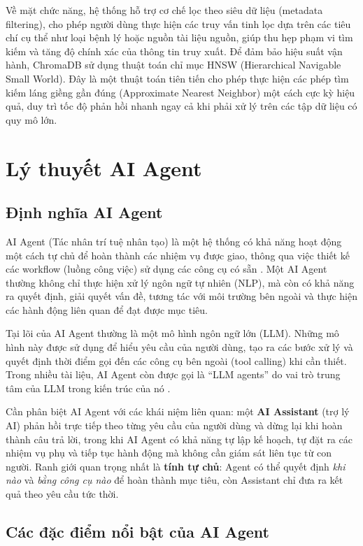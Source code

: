 Về mặt chức năng, hệ thống hỗ trợ cơ chế lọc theo siêu dữ liệu (metadata filtering), cho phép người dùng thực hiện các truy vấn tinh lọc dựa trên các tiêu chí cụ thể như loại bệnh lý hoặc nguồn tài liệu nguồn, giúp thu hẹp phạm vi tìm kiếm và tăng độ chính xác của thông tin truy xuất. Để đảm bảo hiệu suất vận hành, ChromaDB sử dụng thuật toán chỉ mục HNSW (Hierarchical Navigable Small World). Đây là một thuật toán tiên tiến cho phép thực hiện các phép tìm kiếm láng giềng gần đúng (Approximate Nearest Neighbor) một cách cực kỳ hiệu quả, duy trì tốc độ phản hồi nhanh ngay cả khi phải xử lý trên các tập dữ liệu có quy mô lớn.

\section{Lý thuyết AI Agent}

\subsection{Định nghĩa AI Agent}

AI Agent (Tác nhân trí tuệ nhân tạo) là một hệ thống có khả năng hoạt động một cách tự chủ để hoàn thành các nhiệm vụ được giao, thông qua việc thiết kế các workflow (luồng công việc) sử dụng các công cụ có sẵn \cite{ibm2025}. Một AI Agent thường không chỉ thực hiện xử lý ngôn ngữ tự nhiên (NLP), mà còn có khả năng ra quyết định, giải quyết vấn đề, tương tác với môi trường bên ngoài và thực hiện các hành động liên quan để đạt được mục tiêu.

Tại lõi của AI Agent thường là một mô hình ngôn ngữ lớn (LLM). Những mô hình này được sử dụng để hiểu yêu cầu của người dùng, tạo ra các bước xử lý và quyết định thời điểm gọi đến các công cụ bên ngoài (tool calling) khi cần thiết. Trong nhiều tài liệu, AI Agent còn được gọi là ``LLM agents'' do vai trò trung tâm của LLM trong kiến trúc của nó \cite{sumers2023}.

Cần phân biệt AI Agent với các khái niệm liên quan: một \textbf{AI Assistant} (trợ lý AI) phản hồi trực tiếp theo từng yêu cầu của người dùng và dừng lại khi hoàn thành câu trả lời, trong khi AI Agent có khả năng tự lập kế hoạch, tự đặt ra các nhiệm vụ phụ và tiếp tục hành động mà không cần giám sát liên tục từ con người. Ranh giới quan trọng nhất là \textbf{tính tự chủ}: Agent có thể quyết định \emph{khi nào} và \emph{bằng công cụ nào} để hoàn thành mục tiêu, còn Assistant chỉ đưa ra kết quả theo yêu cầu tức thời.

\subsection{Các đặc điểm nổi bật của AI Agent}


